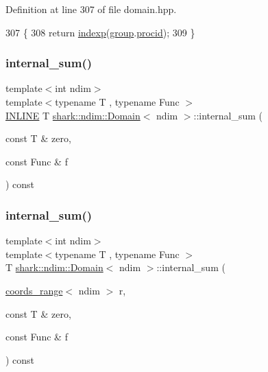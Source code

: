 Definition at line 307 of file domain.\+hpp.


\begin{DoxyCode}
307                                                                        \{
308             \textcolor{keywordflow}{return} \hyperlink{classshark_1_1ndim_1_1_domain_ab8a7d1fa990b118f316f1e630e86b203}{indexp}(\hyperlink{classshark_1_1ndim_1_1_domain_a2bbf100371762ce405efd218bc1e3d0f}{group}.\hyperlink{classshark_1_1_group_af8c22a10243c3d05301280119b72c073}{procid});
309         \}
\end{DoxyCode}
\hypertarget{classshark_1_1ndim_1_1_domain_ae6b753c7b16ffd14e6247d4b00c92d35}{}\label{classshark_1_1ndim_1_1_domain_ae6b753c7b16ffd14e6247d4b00c92d35} 
\subsubsection{\texorpdfstring{internal\+\_\+sum()}{internal\_sum()}\hspace{0.1cm}{\footnotesize\ttfamily [1/3]}}
{\footnotesize\ttfamily template$<$int ndim$>$ \\
template$<$typename T , typename Func $>$ \\
\hyperlink{common_8hpp_a2eb6f9e0395b47b8d5e3eeae4fe0c116}{I\+N\+L\+I\+NE} T \hyperlink{classshark_1_1ndim_1_1_domain}{shark\+::ndim\+::\+Domain}$<$ ndim $>$\+::internal\+\_\+sum (\begin{DoxyParamCaption}\item[{const T \&}]{zero,  }\item[{const Func \&}]{f }\end{DoxyParamCaption}) const}

\hypertarget{classshark_1_1ndim_1_1_domain_aa2e13e2bbd97d87cc3c64ce8017fd430}{}\label{classshark_1_1ndim_1_1_domain_aa2e13e2bbd97d87cc3c64ce8017fd430} 
\subsubsection{\texorpdfstring{internal\+\_\+sum()}{internal\_sum()}\hspace{0.1cm}{\footnotesize\ttfamily [2/3]}}
{\footnotesize\ttfamily template$<$int ndim$>$ \\
template$<$typename T , typename Func $>$ \\
T \hyperlink{classshark_1_1ndim_1_1_domain}{shark\+::ndim\+::\+Domain}$<$ ndim $>$\+::internal\+\_\+sum (\begin{DoxyParamCaption}\item[{\hyperlink{structshark_1_1ndim_1_1coords__range}{coords\+\_\+range}$<$ ndim $>$}]{r,  }\item[{const T \&}]{zero,  }\item[{const Func \&}]{f }\end{DoxyParamCaption}) const}



